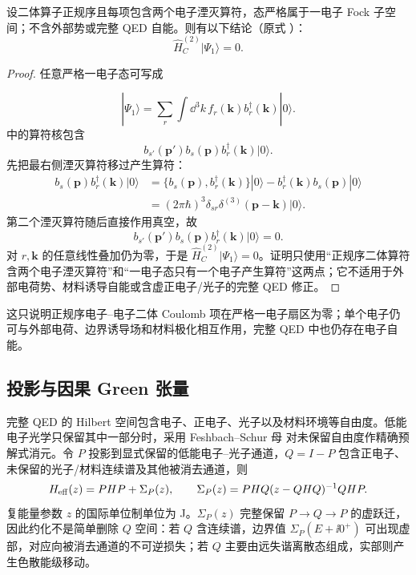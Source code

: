 \begin{proposition}[正规序二体算子在一粒子空间上为零]
设二体算子正规序且每项包含两个电子湮灭算符，态严格属于一电子 Fock 子空间；不含外部势或完整 QED 自能。则有以下结论（原式 ）：
\begin{equation*}
 \boxed{\hat H_C^{(2)}|\Psi_1\rangle=0.}
\end{equation*}
\end{proposition}
\begin{proof}
任意严格一电子态可写成

\begin{equation*}
 |\Psi_1\rangle
 =\sum_r\int\dd^3 k\,f_r(\mathbf k)
 b_r^\dagger(\mathbf k)|0\rangle.
\end{equation*}
 中的算符核包含
\begin{equation*}
 b_{s'}(\mathbf p')b_s(\mathbf p)b_r^\dagger(\mathbf k)|0\rangle.
\end{equation*}
先把最右侧湮灭算符移过产生算符：
\begin{align*}
 b_s(\mathbf p)b_r^\dagger(\mathbf k)|0\rangle
 &=\{b_s(\mathbf p),b_r^\dagger(\mathbf k)\}|0\rangle
 -b_r^\dagger(\mathbf k)b_s(\mathbf p)|0\rangle\\
 &=(2\pi\hbar)^3\delta_{sr}\delta^{(3)}(\mathbf p-\mathbf k)|0\rangle.
\end{align*}
第二个湮灭算符随后直接作用真空，故
\begin{equation*}
 b_{s'}(\mathbf p')b_s(\mathbf p)b_r^\dagger(\mathbf k)|0\rangle=0.
\end{equation*}
对 $r,\mathbf k$ 的任意线性叠加仍为零，于是 $\hat H_C^{(2)}|\Psi_1\rangle=0$。证明只使用“正规序二体算符含两个电子湮灭算符”和“一电子态只有一个电子产生算符”这两点；它不适用于外部电荷势、材料诱导自能或含虚正电子/光子的完整 QED 修正。
\end{proof}

这只说明正规序电子--电子二体 Coulomb 项在严格一电子扇区为零；单个电子仍可与外部电荷、边界诱导场和材料极化相互作用，完整 QED 中也仍存在电子自能。

\subsection{投影与因果 Green 张量}

完整 QED 的 Hilbert 空间包含电子、正电子、光子以及材料环境等自由度。低能电子光学只保留其中一部分时，采用 Feshbach--Schur 母 对未保留自由度作精确预解式消元。令 $P$ 投影到显式保留的低能电子--光子通道，$Q=I-P$ 包含正电子、未保留的光子/材料连续谱及其他被消去通道，则
\begin{equation*}
 H_{\rm eff}(z)=PHP+\Sigma_P(z),
 \qquad
 \Sigma_P(z)=PHQ(z-QHQ)^{-1}QHP.
\end{equation*}
复能量参数 $z$ 的国际单位制单位为 J。$\Sigma_P(z)$ 完整保留 $P\to Q\to P$ 的虚跃迁，因此约化不是简单删除 $Q$ 空间：若 $Q$ 含连续谱，边界值 $\Sigma_P(E+\ii0^+)$ 可出现虚部，对应向被消去通道的不可逆损失；若 $Q$ 主要由远失谐离散态组成，实部则产生色散能级移动。

